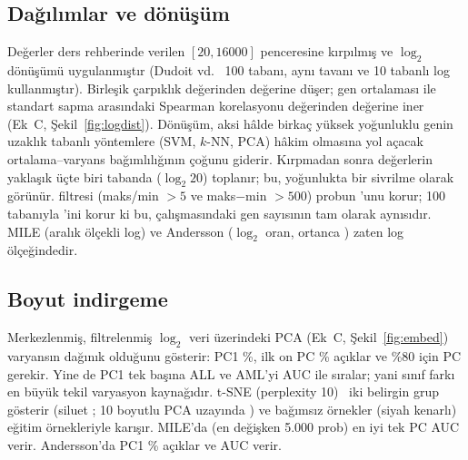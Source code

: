 \documentclass[conference]{IEEEtran}
\newcommand{\figref}[1]{Şekil~\ref{#1}}
\begin{document}
\subsection{Dağılımlar ve dönüşüm}
Değerler ders rehberinde verilen $[20, 16000]$ penceresine kırpılmış ve $\log_2$ dönüşümü uygulanmıştır
(Dudoit vd.~\cite{dudoit2002} 100 tabanı, aynı tavanı ve 10 tabanlı log kullanmıştır). Birleşik
çarpıklık \GolubSkewRaw{} değerinden \GolubSkewLog{} değerine düşer; gen ortalaması ile standart
sapma arasındaki Spearman korelasyonu \GolubRhoLin{} değerinden \GolubRhoLog{} değerine iner (Ek~C,
\figref{fig:logdist}). Dönüşüm, aksi hâlde birkaç yüksek yoğunluklu genin uzaklık tabanlı yöntemlere
(SVM, $k$-NN, PCA) hâkim olmasına yol açacak ortalama--varyans bağımlılığının çoğunu giderir.
Kırpmadan sonra değerlerin yaklaşık üçte biri tabanda ($\log_2 20$) toplanır; bu, yoğunlukta bir
sivrilme olarak görünür. \cite{dudoit2002} filtresi (maks/min $>5$ ve maks$-$min $>500$) \GolubP{}
probun \GolubFilt'unu korur; 100 tabanıyla \GolubFiltDudoit'ini korur ki bu, \cite{dudoit2002}
çalışmasındaki gen sayısının tam olarak aynısıdır. MILE (aralık ölçekli log) ve Andersson ($\log_2$
oran, ortanca \AndMedian{}) zaten log ölçeğindedir.


\subsection{Boyut indirgeme}
Merkezlenmiş, filtrelenmiş $\log_2$ veri üzerindeki PCA (Ek~C, \figref{fig:embed}) varyansın dağınık
olduğunu gösterir: PC1 \%\GolubPCOne{}, ilk on PC \%\GolubCumTen{} açıklar ve \%80 için
\GolubNEighty{} PC gerekir. Yine de PC1 tek başına ALL ve AML'yi AUC \GolubPCOneAUC{} ile sıralar;
yani sınıf farkı en büyük tekil varyasyon kaynağıdır. t-SNE (perplexity 10)~\cite{vandermaaten2008}
iki belirgin grup gösterir (siluet \GolubSilTSNE{}; 10 boyutlu PCA uzayında \GolubSilPCA) ve bağımsız
örnekler (siyah kenarlı) eğitim örnekleriyle karışır. MILE'da (en değişken 5.000 prob) en iyi tek PC
AUC \MileBestPCAUC{} verir. Andersson'da PC1 \%\AndPCOne{} açıklar ve AUC \AndPCOneAUC{} verir.
\end{document}
